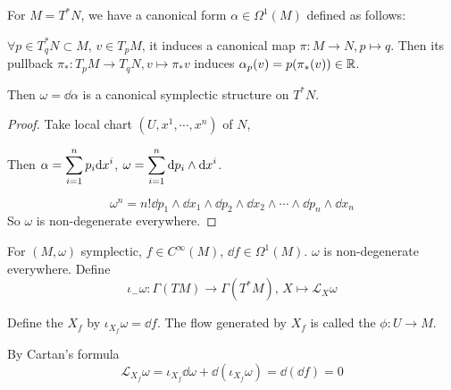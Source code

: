 \begin{example}
    For  $ M=T^*N $, we have a canonical form  $ \alpha\in \Omega^1(M) $ defined as follows:

    $ \forall p\in T_q^*N\subset M $,  $ v\in T_pM $, it induces a canonical map  $ \pi:M\rightarrow N, p\mapsto q $. Then its pullback  $ \pi_*:T_pM\rightarrow T_qN,v\mapsto \pi_*v $ induces  $ \alpha_p(v)=p(\pi_*(v))\in\mathbb R $.
    
    Then  $ \omega=\dd\alpha  $ is a canonical symplectic structure on  $ T^*N $. 
\end{example}
\begin{proof}
    Take local chart $ (U,x^1,\cdots,x^n) $ of  $ N $, 

    \begin{center}
    \end{center}
    
    Then  $ \alpha=\displaystyle\sum_{i=1}^np_i\mathrm{d} x^i $,  $ \omega=\displaystyle\sum_{i=1}^n\mathrm{d} p_i\wedge\mathrm{d} x^i $.
    
    \[\omega^n=n!\dd p_1\wedge\dd x_1\wedge\dd p_2\wedge\dd x_2\wedge\cdots\wedge\dd p_n\wedge\dd x_n\]
    So  $ \omega  $ is non-degenerate everywhere. 
\end{proof}

\begin{definition}
    For  $ (M,\omega) $ symplectic,  $ f\in C^\infty(M) $,  $ \dd f\in \Omega^1(M) $.  $ \omega  $ is non-degenerate everywhere. Define  
    \begin{equation}
        \iota_{-}\omega:\Gamma(TM)\rightarrow \Gamma(T^*M), \, X\mapsto \mathcal{L}_X\omega
    \end{equation}
    
    Define the   $ X_f $ by $ \iota_{X_f}\omega=\dd f $. The flow generated by  $ X_f  $ is called the   $ \phi:U\rightarrow M $. 
\end{definition}

By Cartan's formula 
\begin{equation}
    \mathcal{L}_{X_f}\omega=\iota_{X_f}\dd \omega+\dd (\iota_{X_f}\omega)=\dd (\dd f)=0
\end{equation}

